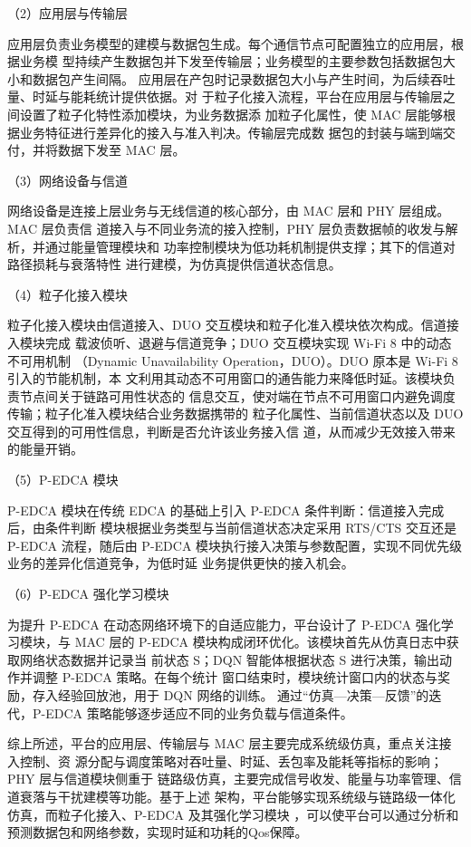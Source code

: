 （2）应用层与传输层

应用层负责业务模型的建模与数据包生成。每个通信节点可配置独立的应用层，根据业务模
型持续产生数据包并下发至传输层；业务模型的主要参数包括数据包大小和数据包产生间隔。
应用层在产包时记录数据包大小与产生时间，为后续吞吐量、时延与能耗统计提供依据。对
于粒子化接入流程，平台在应用层与传输层之间设置了粒子化特性添加模块，为业务数据添
加粒子化属性，使 MAC 层能够根据业务特征进行差异化的接入与准入判决。传输层完成数
据包的封装与端到端交付，并将数据下发至 MAC 层。

（3）网络设备与信道

网络设备是连接上层业务与无线信道的核心部分，由 MAC 层和 PHY 层组成。MAC 层负责信
道接入与不同业务流的接入控制，PHY 层负责数据帧的收发与解析，并通过能量管理模块和
功率控制模块为低功耗机制提供支撑；其下的信道对路径损耗与衰落特性
进行建模，为仿真提供信道状态信息。

（4）粒子化接入模块

粒子化接入模块由信道接入、DUO 交互模块和粒子化准入模块依次构成。信道接入模块完成
载波侦听、退避与信道竞争；DUO 交互模块实现 Wi-Fi 8 中的动态不可用机制
（Dynamic Unavailability Operation，DUO）。DUO 原本是 Wi-Fi 8 引入的节能机制，本
文利用其动态不可用窗口的通告能力来降低时延。该模块负责节点间关于链路可用性状态的
信息交互，使对端在节点不可用窗口内避免调度传输；粒子化准入模块结合业务数据携带的
粒子化属性、当前信道状态以及 DUO 交互得到的可用性信息，判断是否允许该业务接入信
道，从而减少无效接入带来的能量开销。

（5）P-EDCA 模块

P-EDCA 模块在传统 EDCA 的基础上引入 P-EDCA 条件判断：信道接入完成后，由条件判断
模块根据业务类型与当前信道状态决定采用 RTS/CTS 交互还是 P-EDCA 流程，随后由
P-EDCA 模块执行接入决策与参数配置，实现不同优先级业务的差异化信道竞争，为低时延
业务提供更快的接入机会。

（6）P-EDCA 强化学习模块

为提升 P-EDCA 在动态网络环境下的自适应能力，平台设计了 P-EDCA 强化学习模块，与
MAC 层的 P-EDCA 模块构成闭环优化。该模块首先从仿真日志中获取网络状态数据并记录当
前状态 S；DQN 智能体根据状态 S 进行决策，输出动作并调整 P-EDCA 策略。在每个统计
窗口结束时，模块统计窗口内的状态与奖励，存入经验回放池，用于 DQN 网络的训练。
通过“仿真—决策—反馈”的迭代，P-EDCA 策略能够逐步适应不同的业务负载与信道条件。

综上所述，平台的应用层、传输层与 MAC 层主要完成系统级仿真，重点关注接入控制、资
源分配与调度策略对吞吐量、时延、丢包率及能耗等指标的影响；PHY 层与信道模块侧重于
链路级仿真，主要完成信号收发、能量与功率管理、信道衰落与干扰建模等功能。基于上述
架构，平台能够实现系统级与链路级一体化仿真，而粒子化接入、P-EDCA 及其强化学习模块
，可以使平台可以通过分析和预测数据包和网络参数，实现时延和功耗的Qos保障。

